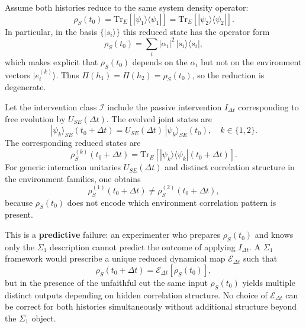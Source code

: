 Assume both histories reduce to the same system density operator:
\begin{equation}
\rho_S(t_0)
=
\mathrm{Tr}_E\!\left[ |\psi_1\rangle\langle\psi_1| \right]
=
\mathrm{Tr}_E\!\left[ |\psi_2\rangle\langle\psi_2| \right].
\end{equation}
In particular, in the basis $\{|s_i\rangle\}$ this reduced state has the operator form
\begin{equation}
\rho_S(t_0) = \sum_i |\alpha_i|^2 \, |s_i\rangle\langle s_i|,
\end{equation}
which makes explicit that $\rho_S(t_0)$ depends on the $\alpha_i$ but not on the environment
vectors $|e_i^{(k)}\rangle$. Thus $\Pi(h_1)=\Pi(h_2)=\rho_S(t_0)$, so the reduction is degenerate.

Let the intervention class $\mathcal{I}$ include the passive intervention $I_{\Delta t}$
corresponding to free evolution by $U_{SE}(\Delta t)$. The evolved joint states are
\begin{equation}
|\psi_k\rangle_{SE}(t_0+\Delta t)
=
U_{SE}(\Delta t)\,|\psi_k\rangle_{SE}(t_0),
\quad k \in \{1,2\}.
\end{equation}
The corresponding reduced states are
\begin{equation}
\rho_S^{(k)}(t_0+\Delta t)
=
\mathrm{Tr}_E\!\left[ |\psi_k\rangle\langle\psi_k| (t_0+\Delta t) \right].
\end{equation}
For generic interaction unitaries $U_{SE}(\Delta t)$ and distinct correlation structure
in the environment families, one obtains
\begin{equation}
\rho_S^{(1)}(t_0+\Delta t) \neq \rho_S^{(2)}(t_0+\Delta t),
\end{equation}
because $\rho_S(t_0)$ does not encode which environment correlation pattern is present.

This is a \textbf{predictive} failure: an experimenter who prepares $\rho_S(t_0)$ and knows only
the $\Sigma_1$ description cannot predict the outcome of applying $I_{\Delta t}$. A $\Sigma_1$ framework
would prescribe a unique reduced dynamical map $\mathcal{E}_{\Delta t}$ such that
\begin{equation}
\rho_S(t_0+\Delta t) = \mathcal{E}_{\Delta t}\!\left[\rho_S(t_0)\right],
\end{equation}
but in the presence of the unfaithful cut the same input $\rho_S(t_0)$ yields multiple distinct
outputs depending on hidden correlation structure. No choice of $\mathcal{E}_{\Delta t}$ can be
correct for both histories simultaneously without additional structure beyond the $\Sigma_1$ object.

